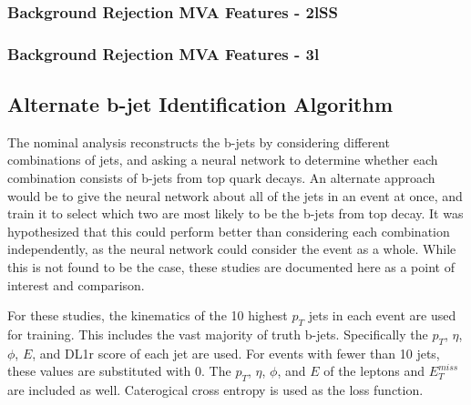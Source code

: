\subsubsection{Background Rejection MVA Features - 2lSS}
\label{apx:sigBkg2lSS}


\subsubsection{Background Rejection MVA Features - 3l}
\label{apx:sigBkg3l}



\subsection{Alternate b-jet Identification Algorithm}
\label{subsec:topRecoApx}

The nominal analysis reconstructs the b-jets by considering different combinations of jets, and asking a neural network to determine whether each combination consists of b-jets from top quark decays. An alternate approach would be to give the neural network about all of the jets in an event at once, and train it to select which two are most likely to be the b-jets from top decay. It was hypothesized that this could perform better than considering each combination independently, as the neural network could consider the event as a whole. While this is not found to be the case, these studies are documented here as a point of interest and comparison.

For these studies, the kinematics of the 10 highest $p_T$ jets in each event are used for training. This includes the vast majority of truth b-jets. Specifically the $p_T$, $\eta$, $\phi$, $E$, and DL1r score of each jet are used. For events with fewer than 10 jets, these values are substituted with 0. The $p_T$, $\eta$, $\phi$, and $E$ of the leptons and $E_T^{miss}$ are included as well. Caterogical cross entropy is used as the loss function.

